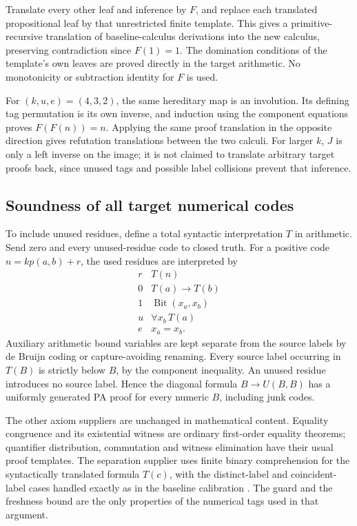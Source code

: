 Translate every other leaf and inference by $F$, and replace each translated
propositional leaf by that unrestricted finite template. This gives a
primitive-recursive translation of baseline-calculus derivations into the
new calculus, preserving contradiction since $F(1)=1$. The domination
conditions of the template's own leaves are proved directly in the target
arithmetic. No monotonicity or subtraction identity for $F$ is used.

For $(k,u,e)=(4,3,2)$, the same hereditary map is an involution. Its defining
tag permutation is its own inverse, and induction using the component
equations proves $F(F(n))=n$. Applying the same proof translation in the
opposite direction gives refutation translations between the two calculi.
For larger $k$, $J$ is only a left inverse on the image; it is not claimed
to translate arbitrary target proofs back, since unused tags and possible
label collisions prevent that inference.

\subsection{Soundness of all target numerical codes}

To include unused residues, define a total syntactic interpretation $T$ in
arithmetic. Send zero and every unused-residue code to closed truth. For a
positive code $n=kp(a,b)+r$, the used residues are interpreted by
\[
\begin{array}{c|l}
r& T(n)\\\hline
0&T(a)\to T(b)\\
1&\operatorname{Bit}(x_a,x_b)\\
u&\forall x_b\,T(a)\\
e&x_a=x_b.
\end{array}
\]
Auxiliary arithmetic bound variables are kept separate from the source
labels by de Bruijn coding or capture-avoiding renaming. Every source label
occurring in $T(B)$ is strictly below $B$, by the component inequality.
An unused residue introduces no source label. Hence the diagonal formula
$B\to U(B,B)$ has a uniformly generated PA proof for every numeric $B$,
including junk codes.

The other axiom suppliers are unchanged in mathematical content. Equality
congruence and its existential witness are ordinary first-order equality
theorems; quantifier distribution, commutation and witness elimination have
their usual proof templates. The separation supplier uses finite binary
comprehension for the syntactically translated formula $T(c)$, with the
distinct-label and coincident-label cases handled exactly as in the
baseline calibration \cite{radix-parent}. The guard and the freshness bound are the only
properties of the numerical tags used in that argument.

